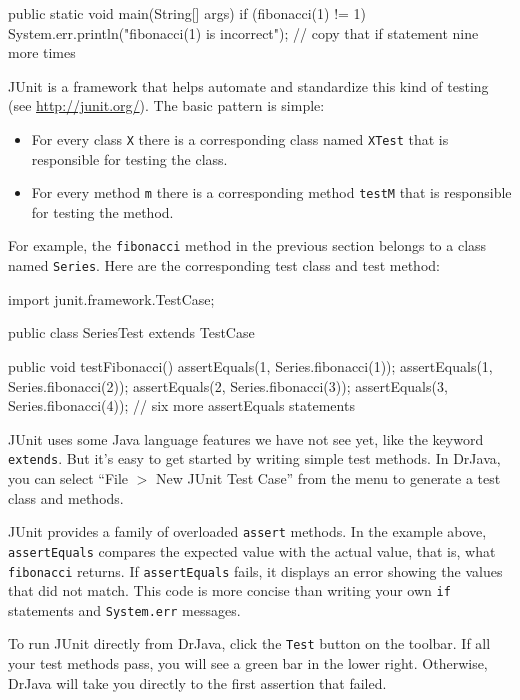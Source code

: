 \documentclass[12pt]{book}
\theoremstyle{exercise}
\newcommand{\java}[1]{\verb"#1"}
\newcommand{\java}[1]{\lstinline{#1}} %
\begin{document}
\begin{code}
    public static void main(String[] args) {
        if (fibonacci(1) != 1) {
            System.err.println("fibonacci(1) is incorrect");
        }
        // copy that if statement nine more times
    }
\end{code}

JUnit is a framework that helps automate and standardize this kind of testing (see \url{http://junit.org/}).
The basic pattern is simple:

\begin{itemize}
\item For every class \java{X} there is a corresponding class named \java{XTest} that is responsible for testing the class.
\item For every method \java{m} there is a corresponding method \java{testM} that is responsible for testing the method.
\end{itemize}

For example, the \java{fibonacci} method in the previous section belongs to a class named \java{Series}.
Here are the corresponding test class and test method:

\begin{code}
import junit.framework.TestCase;

public class SeriesTest extends TestCase {

    public void testFibonacci() {
        assertEquals(1, Series.fibonacci(1));
        assertEquals(1, Series.fibonacci(2));
        assertEquals(2, Series.fibonacci(3));
        assertEquals(3, Series.fibonacci(4));
        // six more assertEquals statements
    }
}
\end{code}

JUnit uses some Java language features we have not see yet, like the keyword \java{extends}.
But it's easy to get started by writing simple test methods.
In \mbox{DrJava}, you can select ``File $>$ New JUnit Test Case'' from the menu to generate a test class and methods.

JUnit provides a family of overloaded \java{assert} methods.
In the example above, \java{assertEquals} compares the expected value with the actual value, that is, what \java{fibonacci} returns.
If \java{assertEquals} fails, it displays an error showing the values that did not match.
This code is more concise than writing your own \java{if} statements and \java{System.err} messages.

To run JUnit directly from DrJava, click the {\tt Test} button on the toolbar.
If all your test methods pass, you will see a green bar in the lower right.
Otherwise, DrJava will take you directly to the first assertion that failed.
\end{document}
